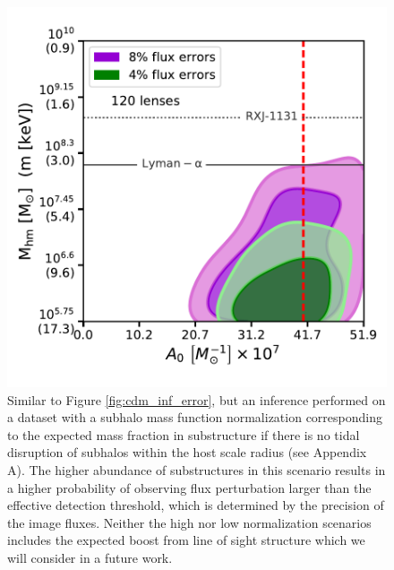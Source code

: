 \begin{figure}
	\centering
	\includegraphics[clip,trim=0cm .5cm .3cm
	.5cm,width=.75\textwidth,keepaspectratio]{./figures_ABCforward/joint_120_4_8_errors_HN.pdf}
	\caption[Posterior distribution inferred from CDM mock datasets with as a function of the SHMF normalization]{\label{fig:cdm_inf_error_highnorm} Similar to Figure \ref{fig:cdm_inf_error}, but an inference performed on a dataset with a subhalo mass function normalization corresponding to the expected mass fraction in substructure if there is no tidal disruption of subhalos within the host scale radius (see Appendix A). The higher abundance of substructures in this scenario results in a higher probability of observing flux perturbation larger than the effective detection threshold, which is determined by the precision of the image fluxes. Neither the high nor low normalization scenarios includes the expected boost from line of sight structure which we will consider in a future work.}
\end{figure}

